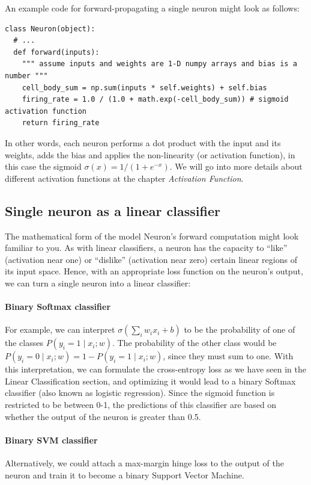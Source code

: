 An example code for forward-propagating a single neuron might look as follows:


\begin{lstlisting}[frame=single]
class Neuron(object):
  # ... 
  def forward(inputs):
    """ assume inputs and weights are 1-D numpy arrays and bias is a number """
    cell_body_sum = np.sum(inputs * self.weights) + self.bias
    firing_rate = 1.0 / (1.0 + math.exp(-cell_body_sum)) # sigmoid activation function
    return firing_rate
\end{lstlisting}

In other words, each neuron performs a dot product with the input and its weights, adds the bias and applies the non-linearity (or activation function), in this case the sigmoid $\sigma(x)=1/(1+e^{-x})$. We will go into more details about different activation functions at the chapter \textit{Activation Function}.

\subsection*{Single neuron as a linear classifier}

The mathematical form of the model Neuron’s forward computation might look familiar to you. As with linear classifiers, a neuron has the capacity to ``like” (activation near one) or ``dislike” (activation near zero) certain linear regions of its input space. Hence, with an appropriate loss function on the neuron’s output, we can turn a single neuron into a linear classifier:

\paragraph*{Binary Softmax classifier} For example, we can interpret $\sigma(\sum_iw_ix_i+b)$ to be the probability of one of the classes $P(y_i=1 \mid x_i;w)$. The probability of the other class would be $P(y_i=0 \mid x_i;w)=1-P(y_i=1 \mid x_i;w)$, since they must sum to one. With this interpretation, we can formulate the cross-entropy loss as we have seen in the Linear Classification section, and optimizing it would lead to a binary Softmax classifier (also known as logistic regression). Since the sigmoid function is restricted to be between 0-1, the predictions of this classifier are based on whether the output of the neuron is greater than 0.5.

\paragraph*{Binary SVM classifier} Alternatively, we could attach a max-margin hinge loss to the output of the neuron and train it to become a binary Support Vector Machine.

